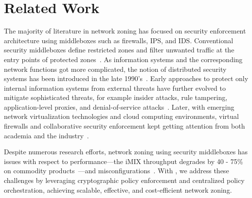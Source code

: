 \chapter{Related Work}
\label{related}

The majority of literature in network zoning has focused on security enforcement
architecture using middleboxes such as firewalls, IPS, and IDS. Conventional
security middleboxes define restricted zones and filter unwanted traffic at the
entry points of protected zones~\cite{cheswick1994firewalls}. As information
systems and the corresponding network functions got more complicated, the notion
of distributed security systems has been introduced in the late
1990's~\cite{bellovin1999distributed}. Early approaches to protect only internal
information systems from external threats have further evolved to mitigate
sophisticated threats, for example insider attacks, rule tampering,
application-level proxies, and denial-of-service
attacks~\cite{markham2001security}. Later, with emerging network virtualization
technologies and cloud computing environments, virtual firewalls and
collaborative security enforcement kept getting attention from both academia and
the industry~\cite{liu2008collaborative,yu2017psi}.

Despite numerous research efforts, network zoning using security middleboxes has
issues with respect to performance---the iMIX throughput degrades by 40 - 75\%
on commodity products~\cite{juniper2020comparison}---and
misconfigurations~\cite{fayaz2016buzz,tschaen2016sfc,yuan2020netsmc}. With
\name, we address these challenges by leveraging cryptographic policy
enforcement and centralized policy orchestration, achieving scalable, effective,
and cost-efficient network zoning.


